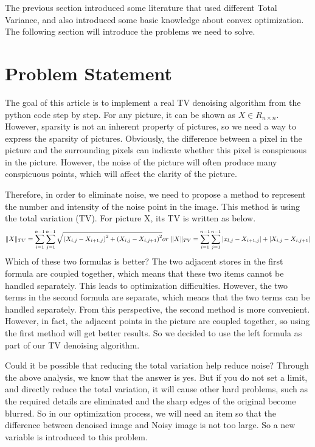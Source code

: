 \documentclass{article}
\begin{document}
The previous section introduced some literature that used different Total Variance, and also introduced some basic knowledge about convex optimization. The following section will introduce the problems we need to solve.

\section{Problem Statement}

The goal of this article is to implement a real TV denoising algorithm from the python code step by step. For any picture, it can be shown as $X \in R_{n\times n}$. However, sparsity is not an inherent property of pictures, so we need a way to express the sparsity of pictures. Obviously, the difference between a pixel in the picture and the surrounding pixels can indicate whether this pixel is conspicuous in the picture. However, the noise of the picture will often produce many conspicuous points, which will affect the clarity of the picture.

Therefore, in order to eliminate noise, we need to propose a method to represent the number and intensity of the noise point in the image. This method is using the total variation (TV). For picture X, its TV is written as below.
$$
\|X\|_{T V}=\sum_{i=1}^{n-1} \sum_{j=1}^{n-1} \sqrt{\left(X_{i, j}-X_{i+1, j}\right)^{2}+\left(X_{i, j}-X_{i, j+1}\right)^{2}}\ \\
or\\
 \ \|X\|_{T V}=\sum_{i=1}^{n-1} \sum_{j=1}^{n-1}\left|x_{l, j}-X_{i+1, j}\right|+\left|X_{i, j}-X_{i, j+1}\right|
$$
Which of these two formulas is better? The two adjacent stores in the first formula are coupled together, which means that these two items cannot be handled separately. This leads to optimization difficulties. However, the two terms in the second formula are separate, which means that the two terms can be handled separately. From this perspective, the second method is more convenient. However, in fact, the adjacent points in the picture are coupled together, so using the first method will get better results. So we decided to use the left formula as part of our TV denoising algorithm.

Could it be possible that reducing the total variation help reduce noise? Through the above analysis, we know that the answer is yes. But if you do not set a limit, and directly reduce the total variation, it will cause other hard problems, such as the required details are eliminated and the sharp edges of the original become blurred. So in our optimization process, we will need an item so that the difference between denoised image and Noisy image is not too large. So a new variable is introduced to this problem.
\end{document}

